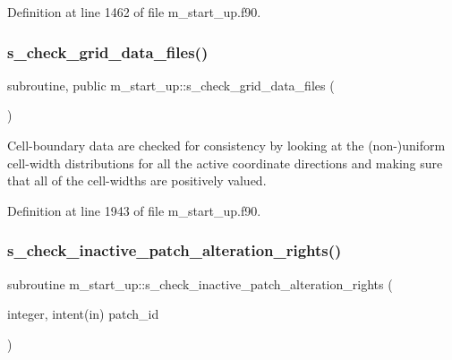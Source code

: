 Definition at line 1462 of file m\+\_\+start\+\_\+up.\+f90.

\mbox{\label{namespacem__start__up_a1d2e9e9354b18d2aab09e673b04032ef}} 
\subsubsection{\texorpdfstring{s\+\_\+check\+\_\+grid\+\_\+data\+\_\+files()}{s\_check\_grid\_data\_files()}}
{\footnotesize\ttfamily subroutine, public m\+\_\+start\+\_\+up\+::s\+\_\+check\+\_\+grid\+\_\+data\+\_\+files (\begin{DoxyParamCaption}{ }\end{DoxyParamCaption})}



Cell-\/boundary data are checked for consistency by looking at the (non-\/)uniform cell-\/width distributions for all the active coordinate directions and making sure that all of the cell-\/widths are positively valued. 



Definition at line 1943 of file m\+\_\+start\+\_\+up.\+f90.

\mbox{\label{namespacem__start__up_a3bf3a6bd18c4f5c2e4aefec6ad9664d8}} 
\subsubsection{\texorpdfstring{s\+\_\+check\+\_\+inactive\+\_\+patch\+\_\+alteration\+\_\+rights()}{s\_check\_inactive\_patch\_alteration\_rights()}}
{\footnotesize\ttfamily subroutine m\+\_\+start\+\_\+up\+::s\+\_\+check\+\_\+inactive\+\_\+patch\+\_\+alteration\+\_\+rights (\begin{DoxyParamCaption}\item[{integer, intent(in)}]{patch\+\_\+id }\end{DoxyParamCaption})}



